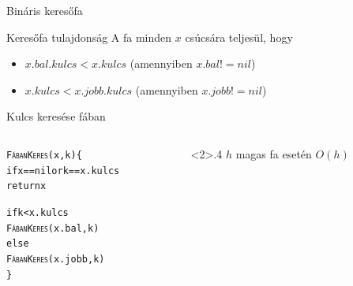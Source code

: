 \documentclass{beamer}
\begin{document}
\begin{frame}{Bináris keresőfa}
	\begin{block}{Keresőfa tulajdonság}
		A fa minden $x$ csúcsára teljesül, hogy
		\begin{itemize}
		\item $x.bal.kulcs < x.kulcs$ (amennyiben $x.bal != nil$)
		\item $x.kulcs < x.jobb.kulcs $ (amennyiben $x.jobb != nil$)
		\end{itemize}
	\end{block}
\end{frame}

\begin{frame}[fragile]{Kulcs keresése fában}
\begin{columns}
\begin{column}{.5\linewidth}
\begin{alltt}
{\scshape FábanKeres}(x, k) \{
   if x == nil or k == x.kulcs
      return x

   if k < x.kulcs
      {\scshape FábanKeres}(x.bal, k)
   else 
      {\scshape FábanKeres}(x.jobb, k)
 \}
\end{alltt}
\end{column}
\begin{column}<2>{.4\linewidth}
$h$ magas fa esetén $O(h)$
\end{column}
\end{columns}
\end{frame}
\end{document}
